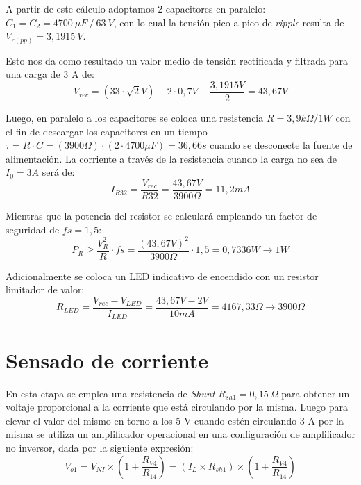 A partir de este cálculo adoptamos 2 capacitores en paralelo: $C_1 =C_2 =4700~\mu F~/~63~V$, con lo cual la tensión pico a pico de \textit{ripple} resulta de  $V_{r(pp)} =3,1915~V$. \par 

Esto nos da como resultado un valor medio de tensión rectificada y filtrada para una carga de 3 A de: 
\begin{equation}
V_{rec} =(33\cdot \sqrt{2}V)-2\cdot 0,7V-\frac{3,1915V}{2}=43,67V
\end{equation} \par 

Luego, en paralelo a los capacitores se coloca una resistencia $R=3,9k\Omega /1W$ con el fin de descargar los capacitores en un tiempo $\tau =R\cdot C=(3900\Omega )\cdot (2\cdot 4700\mu F)=36,66s$ cuando se desconecte la fuente de alimentación. La corriente a través de la resistencia cuando la carga no sea de $I_0 =3A$ será de:
\begin{equation}
I_{R32} =\frac{V_{rec} }{R32}=\frac{43,67V}{3900\Omega }=11,2mA
\end{equation}\par 

Mientras que la potencia del resistor se calculará empleando un factor de seguridad de $fs=1,5$: 
\begin{equation}
P_R \ge \frac{V_R^2 }{R}\cdot fs=\frac{(43,67V)^2 }{3900\Omega }\cdot 1,5=0,7336W\to 1W
\end{equation} \par 

Adicionalmente se coloca un LED indicativo de encendido con un resistor limitador de valor: 
\begin{equation}
R_{LED} =\frac{V_{rec} -V_{LED} }{I_{LED} }=\frac{43,67V-2V}{10mA}=4167,33\Omega \to 3900\Omega
\end{equation} \par 

\section{Sensado de corriente}
En esta etapa se emplea una resistencia de \textit{Shunt} $R_{sh1} =0,15~\Omega$ para obtener un voltaje proporcional a la corriente que está circulando por la misma. Luego para elevar el valor del mismo en torno a los 5 V cuando estén circulando 3 A por la misma se utiliza un amplificador operacional en una configuración de amplificador no inversor, dada por la siguiente expresión:
\begin{equation}
V_{o1} =V_{NI} \times (1+\frac{R_{V4} }{R_{14} })=(I_L \times R_{sh1} )\times (1+\frac{R_{V4} }{R_{14} })
\end{equation}\par 

